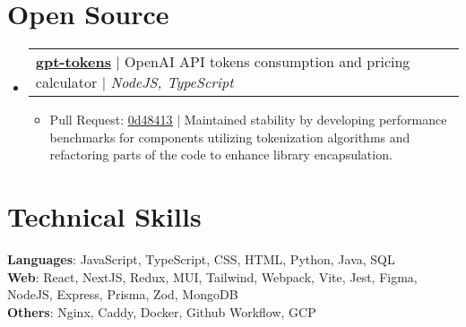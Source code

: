\documentclass[letterpaper,11pt]{article}
\makeatletter
\newcommand{\resumeItem}[1]{
  \item\small{
    {#1 \vspace{-2pt}}
  }
}
\newcommand{\resumeProjectHeading}[2]{
    \item
    \begin{tabular*}{0.97\textwidth}{l@{\extracolsep{\fill}}r}
      \small#1 & #2 \\
    \end{tabular*}\vspace{-7pt}
}
\newcommand{\resumeSubHeadingListStart}{\begin{itemize}[leftmargin=0.15in, label={}]}
\newcommand{\resumeSubHeadingListEnd}{\end{itemize}}
\newcommand{\resumeItemListStart}{\begin{itemize}}
\newcommand{\resumeItemListEnd}{\end{itemize}\vspace{-5pt}}
\makeatother
\begin{document}
\section{Open Source}
  \resumeSubHeadingListStart
    \resumeProjectHeading
      {\textbf{\underline{\href{https://www.npmjs.com/package/gpt-tokens}{gpt-tokens}}} $|$ OpenAI API tokens consumption and pricing calculator $|$ \emph  {NodeJS, TypeScript}}{}
      \resumeItemListStart
        \resumeItem{\faGithub \thinspace \thinspace Pull Request: \underline{\href{https://github.com/Cainier/gpt-tokens/pull/50}{0d48413}} $|$ Maintained stability by developing performance benchmarks for components utilizing tokenization algorithms and refactoring parts of the code to enhance library encapsulation.}
      \resumeItemListEnd
  \resumeSubHeadingListEnd

\section{Technical Skills}
 \begin{itemize}[leftmargin=0.15in, label={}]
    \small{\item{
      \textbf{Languages}{: JavaScript, TypeScript, CSS, HTML, Python, Java, SQL} \\
      \textbf{Web}{: React, NextJS, Redux, MUI, Tailwind, Webpack, Vite, Jest, Figma, NodeJS, Express, Prisma, Zod, MongoDB} \\
      \textbf{Others}{: Nginx, Caddy, Docker, Github Workflow, GCP } \\
     }}
 \end{itemize}


\end{document}
